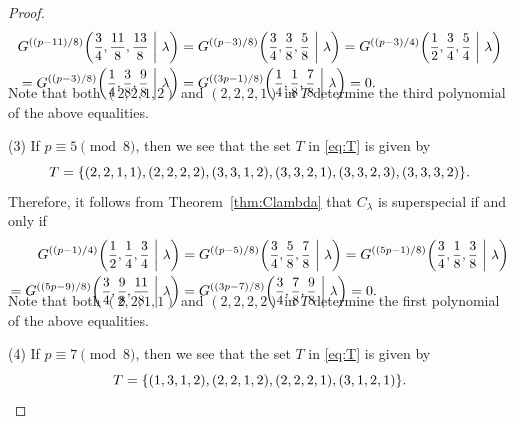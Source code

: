 \documentclass[10pt,a4paper]{amsart}
\begin{document}
\begin{proof}
\begin{align*}
    G^{((p-11)/8)}\scalebox{0.95}{$\displaystyle\left(\frac{3}{4},\frac{11}{8},\frac{13}{8}\ \middle|\ \lambda\right)$} &= G^{((p-3)/8)}\scalebox{0.95}{$\displaystyle\left(\frac{3}{4},\frac{3}{8},\frac{5}{8}\ \middle|\ \lambda\right)$} = G^{((p-3)/4)}\scalebox{0.95}{$\displaystyle\left(\frac{1}{2},\frac{3}{4},\frac{5}{4}\ \middle|\ \lambda\right)$}\\[-0.2mm]
    = G^{((p-3)/8)}\scalebox{0.95}{$\displaystyle\left(\frac{1}{4},\frac{3}{8},\frac{9}{8}\ \middle|\ \lambda\right)$} &= G^{((3p-1)/8)}\scalebox{0.95}{$\displaystyle\left(\frac{1}{4},\frac{1}{8},\frac{7}{8}\ \middle|\ \lambda\right)$} = 0.\\[-6.4mm]
\end{align*}
Note that both $(2,2,1,2)$ and $(2,2,2,1)$ in $T$ determine the third polynomial of the above equalities.\par
\hspace{5.8mm}(3) If $p \equiv 5 \pmod{8}$, then we see that the set $T$ in \eqref{eq:T} is given by\vspace{-1.3mm}
\[
    T = \{(2,2,1,1),(2,2,2,2),(3,3,1,2),(3,3,2,1),(3,3,2,3),(3,3,3,2)\}.\vspace{-0.2mm}
\]
Therefore, it follows from Theorem~\ref{thm:Clambda} that $C_\lambda$ is superspecial if and only if\vspace{-1.1mm}
\begin{align*}
    G^{((p-1)/4)}\scalebox{0.95}{$\displaystyle\left(\frac{1}{2},\frac{1}{4},\frac{3}{4}\ \middle|\ \lambda\right)$} &= G^{((p-5)/8)}\scalebox{0.95}{$\displaystyle\left(\frac{3}{4},\frac{5}{8},\frac{7}{8}\ \middle|\ \lambda\right)$} = G^{((5p-1)/8)}\scalebox{0.95}{$\displaystyle\left(\frac{3}{4},\frac{1}{8},\frac{3}{8}\ \middle|\ \lambda\right)$}\\[-0.2mm]
    = G^{((5p-9)/8)}\scalebox{0.95}{$\displaystyle\left(\frac{3}{4},\frac{9}{8},\frac{11}{8}\ \middle|\ \lambda\right)$} &= G^{((3p-7)/8)}\scalebox{0.95}{$\displaystyle\left(\frac{3}{4},\frac{7}{8},\frac{9}{8}\ \middle|\ \lambda\right)$} = 0.\\[-6.4mm]
\end{align*}
Note that both $(2,2,1,1)$ and $(2,2,2,2)$ in $T$ determine the first polynomial of the above equalities.\newpage\par
\hspace{5.8mm}(4) If $p \equiv 7 \pmod{8}$, then we see that the set $T$ in \eqref{eq:T} is given by\vspace{-1.3mm}
\[
    T = \{(1,3,1,2),(2,2,1,2),(2,2,2,1),(3,1,2,1)\}.\vspace{-0.1mm}
\]
\end{proof}
\end{document}
